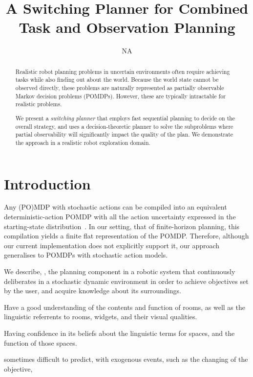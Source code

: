 \documentclass[letterpaper]{article}
\title{A Switching Planner for Combined Task and Observation Planning}
\author{NA}
\begin{document}
 
\maketitle

\begin{abstract}

Realistic robot planning problems in uncertain environments often
require achieving tasks while also finding out about the
world. Because the world state cannot be observed directly, these
problems are naturally represented as partially observable Markov
decision problems (POMDPs). However, these are typically intractable
for realistic problems.

We present a \emph{switching planner} that employs fast sequential
planning to decide on the overall strategy, and uses a
decision-theoretic planner to solve the subproblems where partial
observability will significantly impact the quality of the plan. We
demonstrate the approach in a realistic robot exploration domain.

\end{abstract}

\section{Introduction}


Any (PO)MDP with stochastic actions can be compiled into an equivalent
deterministic-action POMDP with all the action uncertainty expressed
in the starting-state distribution~\cite{ng:Jordan:2000}. In our
setting, that of finite-horizon planning, this compilation yields a
finite flat representation of the POMDP. Therefore, although our
current implementation does not explicitly support it, our approach
generalises to POMDPs with stochastic action models.




We describe, \pcogx, the planning component in a robotic system that
continuously deliberates in a stochastic dynamic environment in order
to achieve objectives set by the user, and acquire knowledge about its
surroundings.

Have a good understanding of the contents and function of rooms, as
well as the linguistic referrents to rooms, widgets, and their visual
qualities.

Having confidence in its beliefs about the linguistic terms for
spaces, and the function of those spaces.



sometimes difficult to predict, with exogenous events, such as the
changing of the objective, 
\end{document}
